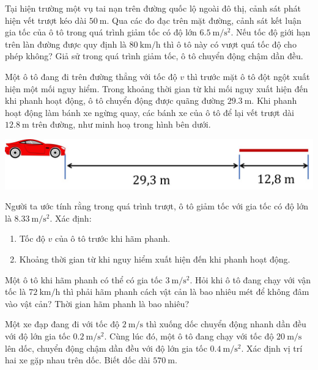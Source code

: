 \begin{ex}
Tại hiện trường một vụ tai nạn trên đường quốc lộ ngoài đô thị, cảnh sát phát hiện vết trượt kéo dài $\SI{50}{\meter}$. Qua các đo đạc trên mặt đường, cảnh sát kết luận gia tốc của ô tô trong quá trình giảm tốc có độ lớn $\SI{6.5}{\meter/\second^2}$. Nếu tốc độ giới hạn trên làn đường được quy định là $\SI{80}{\kilo\meter/\hour}$ thì ô tô này có vượt quá tốc độ cho phép không? Giả sử trong quá trình giảm tốc, ô tô chuyển động chậm dần đều.
	\loigiai{}
\end{ex}
\begin{ex}
	Một ô tô đang đi trên đường thẳng với tốc độ $v$ thì trước mặt ô tô đột ngột xuất hiện một mối nguy hiểm. Trong khoảng thời gian từ khi mối nguy xuất hiện đến khi phanh hoạt động, ô tô chuyển động được quãng đường $\SI{29.3}{\meter}$. Khi phanh hoạt động làm bánh xe ngừng quay, các bánh xe của ô tô để lại vết trượt dài $\SI{12.8}{\meter}$ trên đường, như minh hoạ trong hình bên dưới.
	\begin{center}
		\includegraphics[width=0.5\linewidth]{figs/BAI7-2}
	\end{center}
	Người ta ước tính rằng trong quá trình trượt, ô tô giảm tốc với gia tốc có độ lớn là $\SI{8.33}{\meter/\second^2}$. Xác định:
	\begin{enumerate}[label=\alph*)]
		\item Tốc độ $v$ của ô tô trước khi hãm phanh.
		\item Khoảng thời gian từ khi nguy hiểm xuất hiện đến khi phanh hoạt động.
	\end{enumerate}
	\loigiai{}
\end{ex}
\begin{ex}
	Một ô tô khi hãm phanh có thể có gia tốc $\SI{3}{\meter/\second^2}$. Hỏi khi ô tô đang chạy với vận tốc là $\SI{72}{\kilo\meter/\hour}$ thì phải hãm phanh cách vật cản là bao nhiêu mét để không đâm vào vật cản? Thời gian hãm phanh là bao nhiêu?
	\loigiai{}
\end{ex}
\begin{ex}
	Một xe đạp đang đi với tốc độ $\SI{2}{\meter/\second}$ thì xuống dốc chuyển động nhanh dần đều với độ lớn gia tốc $\SI{0.2}{\meter/\second^2}$. Cùng lúc đó, một ô tô đang chạy với tốc độ $\SI{20}{\meter/\second}$ lên dốc,
	chuyển động chậm dần đều với độ lớn gia tốc $\SI{0.4}{\meter/\second^2}$. Xác định vị trí hai xe gặp nhau trên dốc. Biết dốc dài $\SI{570}{\meter}$.
\end{ex}
